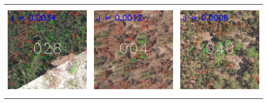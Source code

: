 \documentclass[]{report}   %
\begin{document}
\begin{table}
\begin{tabular}{lll}
\includegraphics[height=1.8in]{figure/top5_3.jpg} & \includegraphics[height=1.8in]{figure/top5_4.jpg} & \includegraphics[height=1.8in]{figure/top5_5.jpg} \\
\end{tabular}
\end{table}
\end{document}
